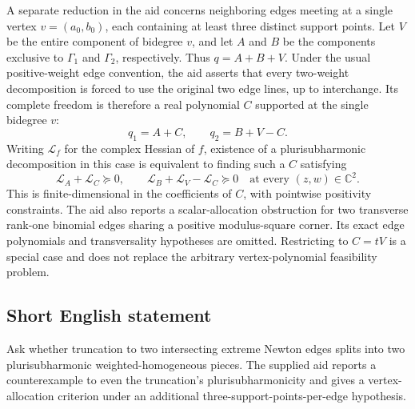 \documentclass[11pt]{article}
\newcommand{\C}{\mathbb{C}}
\begin{document}
A separate reduction in the aid concerns neighboring edges meeting at a single vertex $v=(a_0,b_0)$, each containing at least three distinct support points. Let $V$ be the entire component of bidegree $v$, and let $A$ and $B$ be the components exclusive to $\Gamma_1$ and $\Gamma_2$, respectively. Thus $q=A+B+V$. Under the usual positive-weight edge convention, the aid asserts that every two-weight decomposition is forced to use the original two edge lines, up to interchange. Its complete freedom is therefore a real polynomial $C$ supported at the single bidegree $v$:
\[
q_1=A+C,\qquad q_2=B+V-C.
\]
Writing $\mathcal L_f$ for the complex Hessian of $f$, existence of a plurisubharmonic decomposition in this case is equivalent to finding such a $C$ satisfying
\[
\mathcal L_A+\mathcal L_C\succeq0,\qquad
\mathcal L_B+\mathcal L_V-\mathcal L_C\succeq0
\quad\text{at every }(z,w)\in\C^2.
\]
This is finite-dimensional in the coefficients of $C$, with pointwise positivity constraints. The aid also reports a scalar-allocation obstruction for two transverse rank-one binomial edges sharing a positive modulus-square corner. Its exact edge polynomials and transversality hypotheses are omitted. Restricting to $C=tV$ is a special case and does not replace the arbitrary vertex-polynomial feasibility problem.
\subsection{Short English statement}
Ask whether truncation to two intersecting extreme Newton edges splits into two plurisubharmonic weighted-homogeneous pieces. The supplied aid reports a counterexample to even the truncation's plurisubharmonicity and gives a vertex-allocation criterion under an additional three-support-points-per-edge hypothesis.
\end{document}
